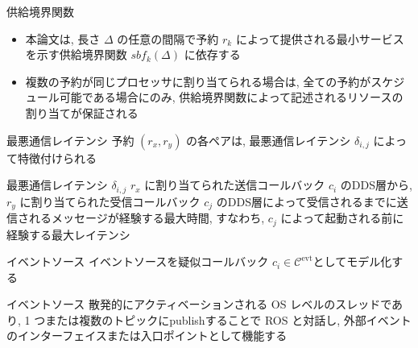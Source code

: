 \begin{frame}{供給境界関数}
    \begin{itemize}
        \item 本論文は, 長さ $\Delta$ の任意の間隔で予約 $r_{k}$ によって提供される最小サービスを示す供給境界関数 $sbf_{k}(\Delta)$ \cite{lipari2003resource, shin2003periodic} に依存する
        \item 複数の予約が同じプロセッサに割り当てられる場合は, 全ての予約がスケジュール可能である場合にのみ, 供給境界関数によって記述されるリソースの割り当てが保証される
    \end{itemize}
\end{frame}

\begin{frame}{最悪通信レイテンシ}
    予約 $\left(r_{x}, r_{y}\right)$ の各ペアは, 最悪通信レイテンシ $\delta_{i, j}$ によって特徴付けられる
    \begin{block}{最悪通信レイテンシ $\delta_{i, j}$}
        $r_x$ に割り当てられた送信コールバック $c_i$ のDDS層から, $r_y$ に割り当てられた受信コールバック $c_j$ のDDS層によって受信されるまでに送信されるメッセージが経験する最大時間, すなわち, $c_j$ によって起動される前に経験する最大レイテンシ
    \end{block}
\end{frame}

\begin{frame}{イベントソース}
    イベントソースを疑似コールバック $c_{i} \in \mathcal{C}^{\text {evt}}$としてモデル化する
    \begin{block}{イベントソース}
        散発的にアクティベーションされる OS レベルのスレッドであり, 1 つまたは複数のトピックにpublishすることで ROS と対話し, 外部イベントのインターフェイスまたは入口ポイントとして機能する
    \end{block}
\end{frame}
